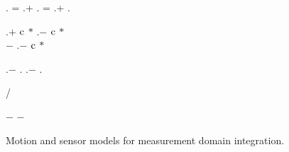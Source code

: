 \begin{figure}[p]
\begin{algorithm}[H]
{        \BlankLine
        \sv \assign \observation.\sv\;
        \clockDrift = \samplex.\clockDrift + \samplex.\residualDrift{\sv}\;
        \clockOffset = \samplex.\clockOffset + \samplex.\residualOffset{\sv}\;

        \BlankLine
        \pseudorange \assign \observation.\pseudorange \(+\) \(\mathrm{c}\) \(*\) \sv.\clockOffset \(-\) \(\mathrm{c}\) \(*\) \clockOffset\\
            \hspace{1em} \(-\) \delays{\sv, \samplex}\;
        \velocity \assign \observation.\velocity \(-\) \(\mathrm{c}\) \(*\) \clockDrift\;

        \BlankLine
        \userToSv \assign \sv.\position \(-\) \samplex.\position\;
        \relativeVelocity \assign \sv.\velocity \(-\) \samplex.\velocity\;

        \geomRange \assign \abs{\userToSv}\;
        \geomVelocity \assign \dotProduct{\relativeVelocity, \userToSv} / \geomRange\;

        \BlankLine
        \rangeError \assign \pseudorange \(-\) \geomRange\;
        \uIf{\abs{\rangeError \(-\) \pseudorangeErrorMu} \(<\) \num{\pseudorangeThreshold}}{
            \result \assign \normpdf{\rangeError, \(\mu\) = \num{\pseudorangeErrorMu}, \(\sigma\) = \num{\pseudorangeErrorSigma}}\;
        }
        \Else{
            \result \assign \num{\pseudorangeThresholdProbability}
        }
        \velocityError \assign \velocity \(-\) \geomVelocity\;
        \uIf{\abs{\velocityError \(-\) \velocityErrorMu} \(<\) \num{\velocityThreshold}}{
            \result \assign \result \(*\) \normpdf{\velocityError, \(\mu\) = \num{\velocityErrorMu}, \(\sigma\) = \num{\velocityErrorSigma}}\;
        }
        \Else{
            \result \assign \result \(*\) \num{\velocityThresholdProbability}
        }
        \Return \result\;
    }
\end{algorithm}
\caption{Motion and sensor models for measurement domain integration.}
\label{algo:gps-measurement-domain}
\end{figure}

